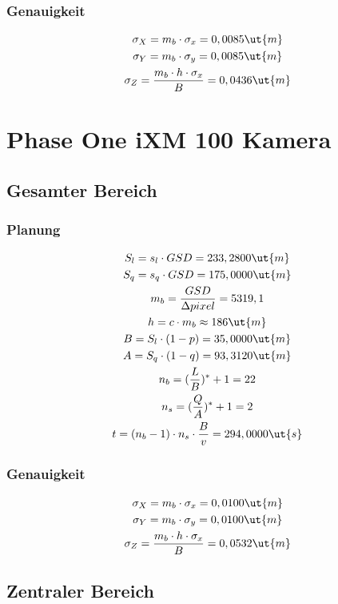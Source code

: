 \subsubsection{Genauigkeit}
\begin{gather*}
\sigma_X = m_b \cdot \sigma_x = 0,0085 \ut{m} \\
\sigma_Y = m_b \cdot \sigma_y = 0,0085\ut{m} \\
\sigma_Z = \frac{m_b \cdot h \cdot \sigma_x}{B} = 0,0436 \ut{m}
\end{gather*}
\newpage

\section{Phase One iXM 100 Kamera}
\subsection{Gesamter Bereich}
\subsubsection{Planung}
\begin{gather*}
S_l = s_l \cdot GSD = 233,2800 \ut{m} \\
S_q = s_q \cdot GSD = 175,0000 \ut{m} \\
m_b = \frac{GSD}{\Delta pixel} = 5319,1 \\
h = c \cdot m_b \approx 186 \ut{m}  \\
B = S_l \cdot (1-p) = 35,0000 \ut{m} \\
A = S_q \cdot (1-q) = 93,3120 \ut{m} \\
n_b = (\frac{L}{B})^* + 1 = 22 \\
n_s = (\frac{Q}{A})^* + 1 = 2 \\	
t = (n_b - 1) \cdot n_s \cdot \frac{B}{v} = 294,0000 \ut{s} \\
\end{gather*}
\subsubsection{Genauigkeit}
\begin{gather*}
\sigma_X = m_b \cdot \sigma_x = 0,0100 \ut{m} \\
\sigma_Y = m_b \cdot \sigma_y = 0,0100 \ut{m} \\
\sigma_Z = \frac{m_b \cdot h \cdot \sigma_x}{B} = 0,0532 \ut{m}
\end{gather*}
\subsection{Zentraler Bereich}

